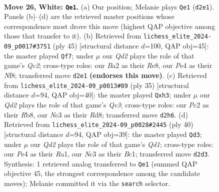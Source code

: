 \documentclass[11pt]{article}
\begin{document}
\begin{figure}[p]
\label{fig:thought-m48}
\end{figure}

\clearpage

\begin{figure}[p]\centering
\begin{subfigure}{0.46\textwidth}\centering
\resizebox{\linewidth}{!}{%
\newchessgame
\chessboard[
  setfen={1n2r1k1/3nqpp1/rp1pb3/4p2p/P3P2N/2N3P1/B1PQ1P1P/R1R3K1 w - - 13 26},
  showmover=false,
  pgfstyle=straightmove, color=movearrow, markmove={d2-e1}
]}
\caption{}
\end{subfigure}\hfill
\begin{subfigure}{0.46\textwidth}\centering
\resizebox{\linewidth}{!}{%
\newchessgame
\chessboard[
  setfen={r3rnk1/1pq3p1/pb1n2pp/3p4/3N4/1NP2P1P/PPQ2BP1/R3R1K1 b - - 7 23},
  showmover=false,
  pgfstyle=straightmove, color=movearrow, markmove={c7-f7}
]}
\caption{}
\end{subfigure}
\\[4pt]
\begin{subfigure}{0.46\textwidth}\centering
\resizebox{\linewidth}{!}{%
\newchessgame
\chessboard[
  setfen={1r1r2k1/ppp2pp1/2n1q2p/3p4/1b1P4/1QN1PN1P/PP2BP2/2R2RK1 b - - 0 18},
  showmover=false,
  pgfstyle=straightmove, color=movearrow, markmove={e6-h3}
]}
\caption{}
\end{subfigure}\hfill
\begin{subfigure}{0.46\textwidth}\centering
\resizebox{\linewidth}{!}{%
\newchessgame
\chessboard[
  setfen={r4rk1/q2nn1p1/1p2p2p/pBbpP3/5P1P/5NP1/PP4K1/R1BQ3R w - - 1 21},
  showmover=false,
  pgfstyle=straightmove, color=movearrow, markmove={d1-d3}
]}
\caption{}
\end{subfigure}
\caption{\textbf{Move 26, White: \texttt{Qe1}.} (a) Our position; Melanie plays \texttt{Qe1} (\texttt{d2e1}). Panels (b)--(d) are the retrieved master positions whose correspondence most drove this move (highest QAP objective among those that transfer to it). (b) Retrieved from \texttt{lichess\_elite\_2024-09\_p0017\#3751} (ply 45) [structural distance $d$=100, QAP obj=45]: the master played \texttt{Qf7}; under $\mu$ our \emph{Qd2} plays the role of that game's \emph{Qc2}; cross-type roles: our \emph{B}a2 as their \emph{R}e8, our \emph{P}e4 as their \emph{N}f8; transferred move \texttt{d2e1} \textbf{(endorses this move)}. (c) Retrieved from \texttt{lichess\_elite\_2024-09\_p0013\#89} (ply 35) [structural distance $d$=94, QAP obj=40]: the master played \texttt{Qxh3}; under $\mu$ our \emph{Qd2} plays the role of that game's \emph{Qe3}; cross-type roles: our \emph{P}c2 as their \emph{R}b8, our \emph{N}c3 as their \emph{R}d8; transferred move \texttt{d2h6}. (d) Retrieved from \texttt{lichess\_elite\_2024-09\_p0028\#2445} (ply 40) [structural distance $d$=94, QAP obj=39]: the master played \texttt{Qd3}; under $\mu$ our \emph{Qd2} plays the role of that game's \emph{Qd1}; cross-type roles: our \emph{P}e4 as their \emph{R}a1, our \emph{N}c3 as their \emph{B}c1; transferred move \texttt{d2d3}. Synthesis: 1 retrieved analog transferred to \texttt{Qe1} (summed QAP objective 45, the strongest correspondence among the candidate moves); Melanie committed it via the \texttt{search} selector.}
\label{fig:thought-m50}
\end{figure}
\end{document}
